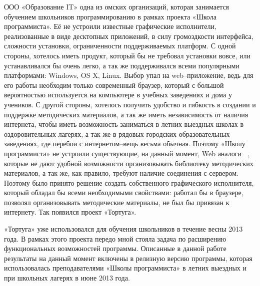 ООО «Образование IT» одна из омских организаций, которая занимается обучением школьников программированию в рамках проекта «Школа программиста». Её не устроили известные графические исполнители, реализованные в виде десктопных приложений, в силу громоздкости интерфейса, сложности установки, ограниченности поддерживаемых платформ. С одной стороны, хотелось иметь продукт, который бы не требовал установки вовсе, или устанавливался бы очень легко, а так же поддерживался всеми популярными платформами: Windows, OS X, Linux. Выбор упал на web–приложение, ведь для его работы необходим только современный браузер, который с большой вероятностью используется на компьютере в учебных заведениях и дома у учеников. С другой стороны, хотелось получить удобство и гибкость в создании и поддержке методических материалов, а так же иметь независимость от наличия интернета, чтобы иметь возможность заниматься в летних выездных школах в оздоровительных лагерях, а так же в рядовых городских образовательных заведениях, где перебои с интернетом–вещь весьма обычная. Поэтому «Школу программиста» не устроили существующие, на данный момент, Web аналоги ~\cite{blockly,codecademy,kodu,appinventor,alice,onlibelogo,logointerpr,logotortoise,tortuelogo,papert,}, которые не дают удобной возможности организовывать библиотеку методических материалов, а так же, как правило, требуют наличие соединения с сервером. Поэтому было принято решение создать собственного графического исполнителя, который обладал бы всеми необходимыми свойствами: работал бы в браузере, позволял организовывать методические материалы, не был бы привязан к интернету. Так появился проект «Тортуга».\par
«Тортуга» уже использовался для обучения школьников в течение весны 2013 года. В рамках этого проекта передо мной стояла задача по расширению функциональных возможностей программы. Описанные в данной работе результаты на данный момент включены в релизную версию программы, которая использовалась преподавателями «Школы программиста» в летних выездных и при школьных лагерях в июне 2013 года.


\clearpage